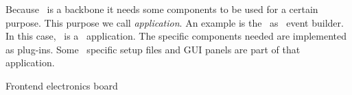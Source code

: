 \bdes
\item [Application] Because \dabc\ is a backbone it needs some components
to be used for a certain purpose. This purpose we call {\sl application}.
An example is the \dabc\ as \mbs\ event builder. In this case, \mbs\ is
a \dabc\ application. The specific components needed are implemented as plug-ins.
Some \mbs\ specific setup files and GUI panels are part of that application.
\item[FEE]Frontend electronics board
\edes

